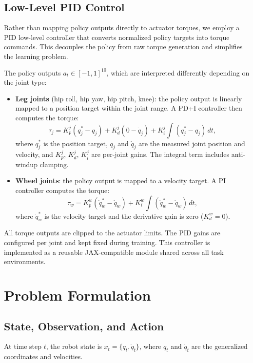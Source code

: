 \documentclass[conference]{IEEEtran}
\begin{document}
\subsection{Low-Level PID Control}
\label{sec:pid}
Rather than mapping policy outputs directly to actuator torques, we employ a PID low-level controller that converts normalized policy targets into torque commands. This decouples the policy from raw torque generation and simplifies the learning problem.

The policy outputs $a_t \in [-1,1]^{10}$, which are interpreted differently depending on the joint type:
\begin{itemize}
    \item \textbf{Leg joints} (hip roll, hip yaw, hip pitch, knee): the policy output is linearly mapped to a position target within the joint range. A PD+I controller then computes the torque:
    \begin{equation}
    \tau_j = K_p^j (q_j^* - q_j) + K_d^j (0 - \dot{q}_j) + K_i^j \int (q_j^* - q_j)\, dt,
    \end{equation}
    where $q_j^*$ is the position target, $q_j$ and $\dot{q}_j$ are the measured joint position and velocity, and $K_p^j$, $K_d^j$, $K_i^j$ are per-joint gains. The integral term includes anti-windup clamping.
    \item \textbf{Wheel joints}: the policy output is mapped to a velocity target. A PI controller computes the torque:
    \begin{equation}
    \tau_w = K_p^w (\dot{q}_w^* - \dot{q}_w) + K_i^w \int (\dot{q}_w^* - \dot{q}_w)\, dt,
    \end{equation}
    where $\dot{q}_w^*$ is the velocity target and the derivative gain is zero ($K_d^w = 0$).
\end{itemize}

All torque outputs are clipped to the actuator limits. The PID gains are configured per joint and kept fixed during training. This controller is implemented as a reusable JAX-compatible module shared across all task environments.

\section{Problem Formulation}

\subsection{State, Observation, and Action}
At time step $t$, the robot state is $x_t = \{q_t, \dot{q}_t\}$, where $q_t$ and $\dot{q}_t$ are the generalized coordinates and velocities.
\end{document}
